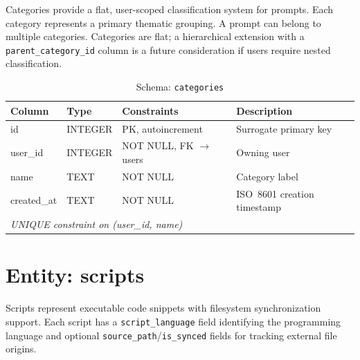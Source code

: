 \documentclass[a4paper, 11pt, oneside]{report}
\begin{document}
Categories provide a flat, user-scoped classification system for prompts.
Each category represents a primary thematic grouping.  A prompt can
belong to multiple categories.  Categories are flat; a hierarchical
extension with a \texttt{parent\_category\_id} column is a future
consideration if users require nested classification.

\begin{table}[H]
  \centering
  \caption{Schema: \texttt{categories}}
  \label{tab:schema-categories}
  \begin{tabularx}{\textwidth}{l l l X}
    \toprule
    \textbf{Column} & \textbf{Type} & \textbf{Constraints} & \textbf{Description} \\
    \midrule
    id         & INTEGER & PK, autoincrement        & Surrogate primary key \\
    user\_id   & INTEGER & NOT NULL, FK $\to$ users  & Owning user \\
    name       & TEXT    & NOT NULL                  & Category label \\
    created\_at& TEXT    & NOT NULL                  & ISO~8601 creation timestamp \\
    \multicolumn{4}{l}{\textit{UNIQUE constraint on (user\_id, name)}} \\
    \bottomrule
  \end{tabularx}
\end{table}

\section{Entity: scripts}
\label{sec:entity-scripts}

Scripts represent executable code snippets with filesystem synchronization
support.  Each script has a \texttt{script\_language} field identifying the
programming language and optional \texttt{source\_path}\slash\texttt{is\_synced}
fields for tracking external file origins.
\end{document}
